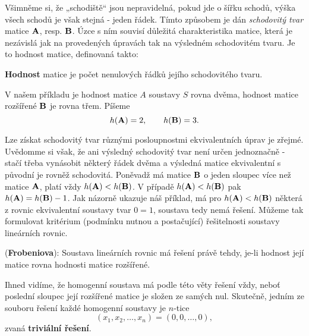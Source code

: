     Všimněme si, že „schodiště“ jsou nepravidelná, pokud jde o šířku schodů, výška všech schodů
    je však stejná - jeden řádek. Tímto způsobem je dán \emph{schodovitý tvar} matice \(\mathbf{A}\), 
    resp. \(\mathbf{B}\). Úzce s ním souvisí důležitá charakteristika matice, která je nezávislá jak 
    na provedených úpravách tak na výsledném schodovitém tvaru. Je to hodnost matice, definovaná 
    takto:
    
    \textbf{Hodnost} matice je počet nenulových řádků jejího schodovitého tvaru.
    
    V našem příkladu je hodnost matice \(A\) soustavy \(S\) rovna dvěma, hodnost matice rozšířené 
    \(\mathbf{B}\) je rovna třem. Píšeme
    \begin{equation*}
      h(\mathbf{A}) = 2,\qquad h(\mathbf{B}) = 3.
    \end{equation*}
    
    \begin{note}
      Lze získat schodovitý tvar různými posloupnostmi ekvivalentních úprav je zřejmé. Uvědomme si 
      však, že ani výsledný schodovitý tvar není určen jednoznačně - stačí třeba vynásobit některý 
      řádek dvěma a výsledná matice ekvivalentní s původní je rovněž schodovitá. Poněvadž má matice 
      \(\mathbf{B}\) o jeden sloupec více než matice \(\mathbf{A}\), platí vždy \(h(\mathbf{A}) < 
      h(\mathbf{B})\). V případě \(h(\mathbf{A}) < h(\mathbf{B})\) pak \(h(\mathbf{A}) = h(\mathbf{B}) - 1\). 
      Jak názorně ukazuje náš příklad, má pro \(h(\mathbf{A}) < h(\mathbf{B})\) některá z rovnic 
      ekvivalentní soustavy tvar \(0 = 1\), soustava tedy nemá řešení. Můžeme tak formulovat 
      kritérium (podmínku nutnou a postačující) řešitelnosti soustavy lineárních rovnic.
    \end{note}
    
    \begin{lemma}\label{mai:lemma001}
      (\textbf{Frobeniova}): Soustava lineárních rovnic má řešení právě tehdy, je-li hodnost její 
      matice rovna hodnosti matice rozšířené.
    \end{lemma}
    
    Ihned vidíme, že homogenní soustava má podle této věty řešení vždy, neboť poslední sloupec její 
    rozšířené matice je složen ze samých nul. Skutečně, jedním ze souboru řešení každé
    homogenní soustavy je \(n\)-tice
    \begin{equation*}
      (x_1, x_2, \ldots, x_n) = (0, 0, \ldots, 0),
    \end{equation*}
    zvaná \textbf{triviální řešení}.
    
